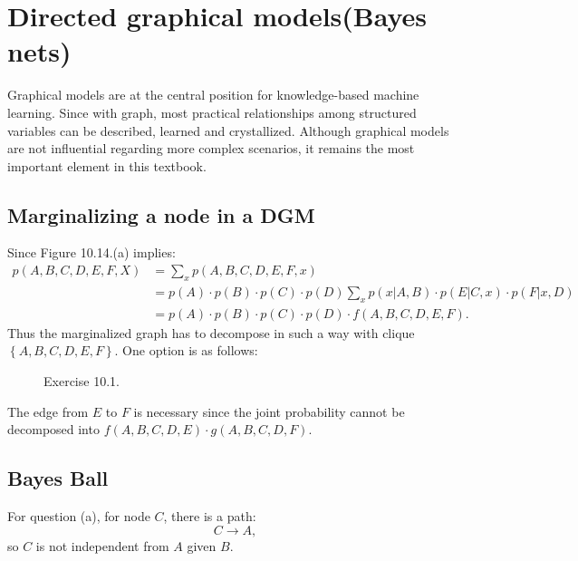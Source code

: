 \documentclass[UTF8]{ctexart}
\begin{document}
\newpage
\section{Directed graphical models(Bayes nets)}
Graphical models are at the central position for knowledge-based machine learning.
Since with graph, most practical relationships among structured variables can be described, learned and crystallized.
Although graphical models are not influential regarding more complex scenarios, it remains the most important element in this textbook.

\subsection{Marginalizing a node in a DGM}
Since Figure 10.14.(a) implies:
$$
\begin{aligned}
p(A,B,C,D,E,F,X)&=\sum_{x}p(A,B,C,D,E,F,x)\\
&=p(A)\cdot p(B)\cdot p(C)\cdot p(D)\sum_{x}p(x|A,B)\cdot p(E|C,x)\cdot p(F|x,D)\\
&=p(A)\cdot p(B)\cdot p(C)\cdot p(D) \cdot f(A,B,C,D,E,F).
\end{aligned}
$$
Thus the marginalized graph has to decompose in such a way with clique $\left\{A,B,C,D,E,F \right\}.$
One option is as follows:
\begin{figure}[htbp]
\centering
{}
\caption{Exercise 10.1.}
\end{figure}
The edge from $E$ to $F$ is necessary since the joint probability cannot be decomposed into $f(A,B,C,D,E)\cdot g(A,B,C,D,F)$.

\subsection{Bayes Ball}
For question (a), for node $C$, there is a path:
$$C\rightarrow A,$$
so $C$ is not independent from $A$ given $B$.
\end{document}
